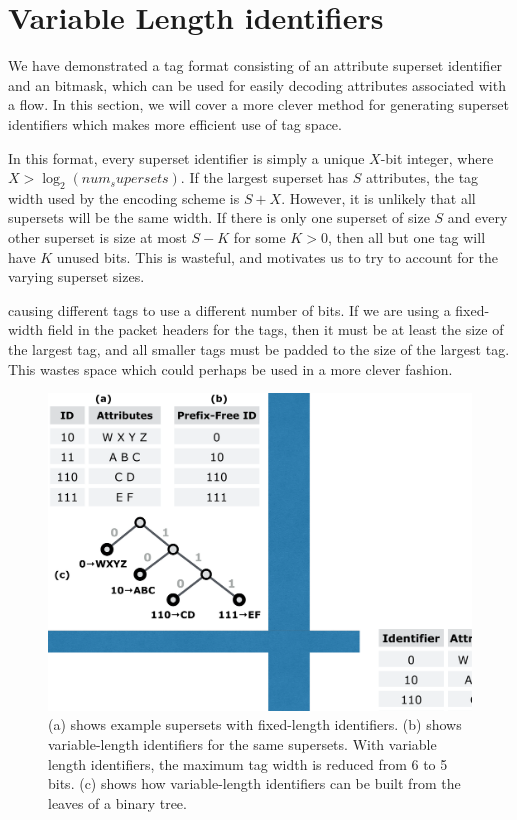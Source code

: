 \section{Variable Length identifiers}\label{sec:identifiers}
We have demonstrated a tag format consisting of an attribute superset identifier and an bitmask, which can be used for easily decoding attributes associated with a flow. In this section, we will cover a more clever method for generating superset identifiers which makes more efficient use of tag space. 

In this format, every superset identifier is simply a unique $X$-bit integer, where $X > \log_2(num_supersets)$. If the largest superset has $S$ attributes, the tag width used by the encoding scheme is $S + X$. However, it is unlikely that all supersets will be the same width. If there is only one superset of size $S$ and every other superset is size at most $S-K$ for some $K > 0$, then all but one tag will have $K$ unused bits. This is wasteful, and motivates us to try to account for the varying superset sizes. 

 causing different tags to use a different number of bits. If we are using a fixed-width field in the packet headers for the tags, then it must be at least the size of the largest tag, and all smaller tags must be padded to the size of the largest tag. This wastes space which could perhaps be used in a more clever fashion.

\begin{figure}[t!] 
\begin{minipage}{1\linewidth}

	\includegraphics[trim={2cm 7cm 18cm 10cm}, clip, width=\linewidth]{figures/variable_identifiers}
\end{minipage} 
\caption{(a) shows example supersets with fixed-length identifiers. (b) shows variable-length identifiers for the same supersets. With variable length identifiers, the maximum tag width is reduced from 6 to 5 bits. (c) shows how variable-length identifiers can be built from the leaves of a binary tree.}
\label{fig:variable_id}
\end{figure}

